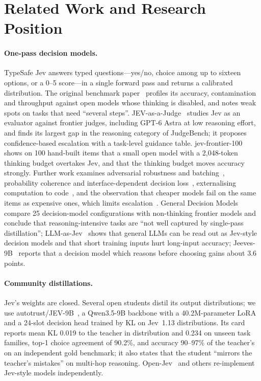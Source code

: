 \section{Related Work and Research Position}
\label{sec:related}

\paragraph{One-pass decision models.}
TypeSafe Jev answers typed questions---yes/no, choice among up to sixteen options, or a 0--5 score---in a single forward pass and returns a calibrated distribution.
The original benchmark paper~\citep{jevbench2026} profiles its accuracy, contamination and throughput against open models whose thinking is disabled, and notes weak spots on tasks that need ``several steps''.
JEV-as-a-Judge~\citep{jevjudge2026} studies Jev as an evaluator against frontier judges, including GPT-6 Astra at low reasoning effort, and finds its largest gap in the reasoning category of JudgeBench; it proposes confidence-based escalation with a task-level guidance table.
jev-frontier-100~\citep{jevfrontier100} shows on 100 hand-built items that a small open model with a 2{,}048-token thinking budget overtakes Jev, and that the thinking budget moves accuracy strongly.
Further work examines adversarial robustness and batching~\citep{jevadvbench2026}, probability coherence and interface-dependent decision loss~\citep{probcontracts2026,addup2026,beyondcal2026}, externalising computation to code~\citep{codeownssim2026}, and the observation that cheaper models fail on the same items as expensive ones, which limits escalation~\citep{samewrong2026}.
General Decision Models~\citep{gdm2026} compare 25 decision-model configurations with non-thinking frontier models and conclude that reasoning-intensive tasks are ``not well captured by single-pass distillation''; LLM-as-Jev~\citep{llmasjev2026} shows that general LLMs can be read out as Jev-style decision models and that short training inputs hurt long-input accuracy; Jeeves-9B~\citep{jeeves2026} reports that a decision model which reasons before choosing gains about 3.6 points.

\paragraph{Community distillations.}
Jev's weights are closed.
Several open students distil its output distributions; we use autotrust/JEV-9B~\citep{jev9bcard}, a Qwen3.5-9B backbone with a 40.2M-parameter LoRA and a 24-slot decision head trained by KL on Jev~1.13 distributions.
Its card reports mean KL 0.019 to the teacher in distribution and 0.234 on unseen task families, top-1 choice agreement of 90.2\%, and accuracy 90--97\% of the teacher's on an independent gold benchmark; it also states that the student ``mirrors the teacher's mistakes'' on multi-hop reasoning.
Open-Jev~\citep{openjev} and others re-implement Jev-style models independently.


